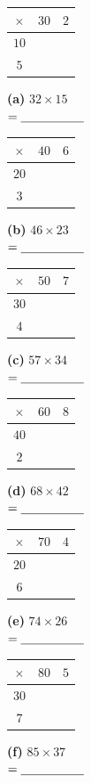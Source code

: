 \documentclass[12pt,a4paper]{article}
\newcommand{\gridtwo}[4]{%
  \renewcommand{\arraystretch}{1.9}%
  \begin{tabular}{|c|c|c|}
    \hline
    $\times$ & $#1$ & $#2$ \\ \hline
    $#3$     &      &      \\ \hline
    $#4$     &      &      \\ \hline
  \end{tabular}%
  \renewcommand{\arraystretch}{1.45}}
\begin{document}
\vspace{4pt}
\noindent
\begin{minipage}[c]{0.30\textwidth}\gridtwo{30}{2}{10}{5}\end{minipage}%
\begin{minipage}[c]{0.20\textwidth}\textbf{(a)} $32 \times 15$ \\[4pt] $= \blank[1.8cm]$\end{minipage}%
\begin{minipage}[c]{0.30\textwidth}\gridtwo{40}{6}{20}{3}\end{minipage}%
\begin{minipage}[c]{0.20\textwidth}\textbf{(b)} $46 \times 23$ \\[4pt] $= \blank[1.8cm]$\end{minipage}

\vspace{11pt}
\noindent
\begin{minipage}[c]{0.30\textwidth}\gridtwo{50}{7}{30}{4}\end{minipage}%
\begin{minipage}[c]{0.20\textwidth}\textbf{(c)} $57 \times 34$ \\[4pt] $= \blank[1.8cm]$\end{minipage}%
\begin{minipage}[c]{0.30\textwidth}\gridtwo{60}{8}{40}{2}\end{minipage}%
\begin{minipage}[c]{0.20\textwidth}\textbf{(d)} $68 \times 42$ \\[4pt] $= \blank[1.8cm]$\end{minipage}

\vspace{11pt}
\noindent
\begin{minipage}[c]{0.30\textwidth}\gridtwo{70}{4}{20}{6}\end{minipage}%
\begin{minipage}[c]{0.20\textwidth}\textbf{(e)} $74 \times 26$ \\[4pt] $= \blank[1.8cm]$\end{minipage}%
\begin{minipage}[c]{0.30\textwidth}\gridtwo{80}{5}{30}{7}\end{minipage}%
\begin{minipage}[c]{0.20\textwidth}\textbf{(f)} $85 \times 37$ \\[4pt] $= \blank[1.8cm]$\end{minipage}

\end{document}
